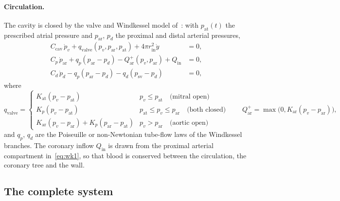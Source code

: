 \documentclass[11pt,a4paper]{article}
\newcommand{\rin}{r_{\mathrm{in}}}
\begin{document}
\paragraph{Circulation.}
The cavity is closed by the valve and Windkessel model of~\cite{Caruel2014}: with $p_{\mathrm{at}}(t)$ the prescribed atrial pressure and $p_{\mathrm{ar}}$, $p_d$ the proximal and distal arterial pressures,
\begin{align}
  C_{\mathrm{cav}}\,\dot p_v+q_{\mathrm{valve}}(p_v,p_{\mathrm{ar}},p_{\mathrm{at}})+4\pi\rin^2\dot y&=0, \label{eq:cav}\\
  C_p\,\dot p_{\mathrm{ar}}+q_p(p_{\mathrm{ar}}-p_d)-Q^+_{\mathrm{ar}}(p_v,p_{\mathrm{ar}})+Q_{\mathrm{in}}&=0, \label{eq:wk1}\\
  C_d\,\dot p_d-q_p(p_{\mathrm{ar}}-p_d)-q_d(p_{\mathrm{sv}}-p_d)&=0, \label{eq:wk2}
\end{align}
where
\begin{equation}
  q_{\mathrm{valve}}=
  \begin{cases}
    K_{\mathrm{at}}(p_v-p_{\mathrm{at}}) & p_v\le p_{\mathrm{at}}\quad\text{(mitral open)}\\
    K_p(p_v-p_{\mathrm{at}}) & p_{\mathrm{at}}\le p_v\le p_{\mathrm{ar}}\quad\text{(both closed)}\\
    K_{\mathrm{ar}}(p_v-p_{\mathrm{ar}})+K_p(p_{\mathrm{ar}}-p_{\mathrm{at}}) & p_v>p_{\mathrm{ar}}\quad\text{(aortic open)}
  \end{cases}
  \qquad
  Q^+_{\mathrm{ar}}=\max\big(0,K_{\mathrm{ar}}(p_v-p_{\mathrm{ar}})\big),
  \label{eq:valve}
\end{equation}
and $q_p$, $q_d$ are the Poiseuille or non-Newtonian tube-flow laws of the Windkessel branches. The coronary inflow $Q_{\mathrm{in}}$ is drawn from the proximal arterial compartment in~\eqref{eq:wk1}, so that blood is conserved between the circulation, the coronary tree and the wall.

\subsection{The complete system}
\label{sec:complete}
\end{document}
